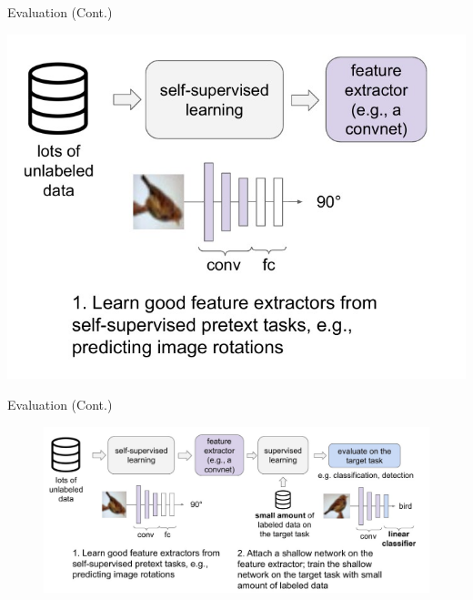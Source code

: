 \documentclass[serif, aspectratio=169]{beamer}
\begin{document}





\begin{frame}{Evaluation (Cont.)}
        
     \begin{flushleft}
           \includegraphics[keepaspectratio, scale=0.5]{pic/Evaluation-1.jpg}
\end{flushleft}
  
\end{frame}


\begin{frame}{Evaluation (Cont.)}
        \begin{figure}[htpb]
   
           \includegraphics[keepaspectratio, scale=0.5]{pic/Evaluation-2.jpg}

    \end{figure}
\end{frame}
\end{document}
